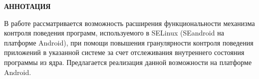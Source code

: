 \documentclass[russian,utf8,pointsubsection,emptystyle, 12pt]{eskdtext}
\begin{document}
\maketitle


\large{\textbf{АННОТАЦИЯ}}

В работе рассматривается возможность расширения функциональности
механизма контроля поведения программ, используемого в SELinux
(SEandroid на платформе Android), при помощи повышения гранулярности
контроля поведения приложений в указанной системе за счет отслеживания
внутреннего состояния программы из ядра. Предлагается реализация данной
возможности на платформе Android.

\newpage

\tableofcontents
\newpage

%






% 
\end{document}
